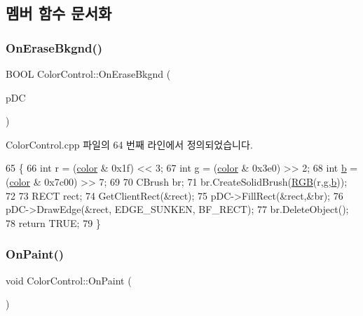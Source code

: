 \subsection{멤버 함수 문서화}
\mbox{\label{class_color_control_a06b4b2fd6e06aab248c7e63859ea4f11}} 
\subsubsection{\texorpdfstring{On\+Erase\+Bkgnd()}{OnEraseBkgnd()}}
{\footnotesize\ttfamily B\+O\+OL Color\+Control\+::\+On\+Erase\+Bkgnd (\begin{DoxyParamCaption}\item[{C\+DC $\ast$}]{p\+DC }\end{DoxyParamCaption})\hspace{0.3cm}{\ttfamily [protected]}}



Color\+Control.\+cpp 파일의 64 번째 라인에서 정의되었습니다.


\begin{DoxyCode}
65 \{
66   \textcolor{keywordtype}{int} r = (\mbox{\hyperlink{class_color_control_adda78267113753c247e7edcaae47f927}{color}} & 0x1f) << 3;
67   \textcolor{keywordtype}{int} g = (\mbox{\hyperlink{class_color_control_adda78267113753c247e7edcaae47f927}{color}} & 0x3e0) >> 2;
68   \textcolor{keywordtype}{int} \mbox{\hyperlink{expr-lex_8cpp_a91b64995742fd30063314f12340b4b5a}{b}} = (\mbox{\hyperlink{class_color_control_adda78267113753c247e7edcaae47f927}{color}} & 0x7c00) >> 7;
69 
70   CBrush br;
71   br.CreateSolidBrush(\mbox{\hyperlink{bilinear_8cpp_a4a118ad3ee36468a3fa616977a64864e}{RGB}}(r,g,\mbox{\hyperlink{expr-lex_8cpp_a91b64995742fd30063314f12340b4b5a}{b}}));
72 
73   RECT rect;
74   GetClientRect(&rect);
75   pDC->FillRect(&rect,&br);
76   pDC->DrawEdge(&rect, EDGE\_SUNKEN, BF\_RECT);
77   br.DeleteObject();
78   \textcolor{keywordflow}{return} TRUE;
79 \}
\end{DoxyCode}
\mbox{\label{class_color_control_a63bcd96ef7044bf702632cab0fc41eba}} 
\subsubsection{\texorpdfstring{On\+Paint()}{OnPaint()}}
{\footnotesize\ttfamily void Color\+Control\+::\+On\+Paint (\begin{DoxyParamCaption}{ }\end{DoxyParamCaption})\hspace{0.3cm}{\ttfamily [protected]}}




